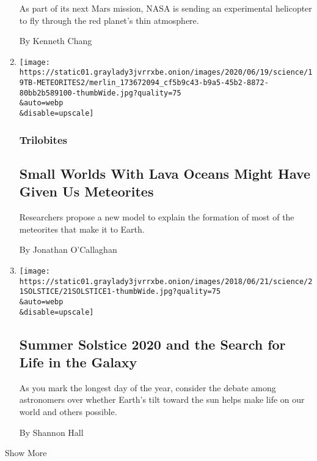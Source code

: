 \begin{enumerate}
  As part of its next Mars mission, NASA is sending an experimental
  helicopter to fly through the red planet's thin atmosphere.

  By Kenneth Chang
\item
  \href{/2020/06/22/science/meteorites-chondrites-chondrules.html}{}

  \texttt{[image: https://static01.graylady3jvrrxbe.onion/images/2020/06/19/science/19TB-METEORITES2/merlin\_173672094\_cf5b9c43-b9a5-45b2-8872-80bb2b589100-thumbWide.jpg?quality=75\\\&auto=webp\\\&disable=upscale]}

  \hypertarget{trilobites}{%
  \subsubsection{Trilobites}\label{trilobites}}

  \hypertarget{small-worlds-with-lava-oceans-might-have-given-us-meteorites}{%
  \subsection{Small Worlds With Lava Oceans Might Have Given Us
  Meteorites}\label{small-worlds-with-lava-oceans-might-have-given-us-meteorites}}

  Researchers propose a new model to explain the formation of most of
  the meteorites that make it to Earth.

  By Jonathan O'Callaghan
\item
  \href{/article/summer-solstice-meaning-sunset.html}{}

  \texttt{[image: https://static01.graylady3jvrrxbe.onion/images/2018/06/21/science/21SOLSTICE/21SOLSTICE1-thumbWide.jpg?quality=75\\\&auto=webp\\\&disable=upscale]}

  \hypertarget{summer-solstice-2020-and-the-search-for-life-in-the-galaxy}{%
  \subsection{Summer Solstice 2020 and the Search for Life in the
  Galaxy}\label{summer-solstice-2020-and-the-search-for-life-in-the-galaxy}}

  As you mark the longest day of the year, consider the debate among
  astronomers over whether Earth's tilt toward the sun helps make life
  on our world and others possible.

  By Shannon Hall
\end{enumerate}

Show More

